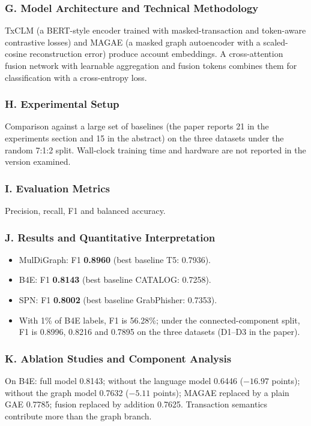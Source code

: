 \documentclass[11pt,a4paper]{article}
\begin{document}
\subsubsection*{G. Model Architecture and Technical Methodology}
TxCLM (a BERT-style encoder trained with masked-transaction and token-aware contrastive losses) and MAGAE (a masked graph autoencoder with a scaled-cosine reconstruction error) produce account embeddings. A cross-attention fusion network with learnable aggregation and fusion tokens combines them for classification with a cross-entropy loss.

\subsubsection*{H. Experimental Setup}
Comparison against a large set of baselines (the paper reports 21 in the experiments section and 15 in the abstract) on the three datasets under the random 7:1:2 split. Wall-clock training time and hardware are not reported in the version examined.

\subsubsection*{I. Evaluation Metrics}
Precision, recall, F1 and balanced accuracy.

\subsubsection*{J. Results and Quantitative Interpretation}
\begin{itemize}[leftmargin=*]
    \item MulDiGraph: F1 \textbf{0.8960} (best baseline T5: 0.7936).
    \item B4E: F1 \textbf{0.8143} (best baseline CATALOG: 0.7258).
    \item SPN: F1 \textbf{0.8002} (best baseline GrabPhisher: 0.7353).
    \item With 1\% of B4E labels, F1 is 56.28\%; under the connected-component split, F1 is 0.8996, 0.8216 and 0.7895 on the three datasets (D1--D3 in the paper).
\end{itemize}

\subsubsection*{K. Ablation Studies and Component Analysis}
On B4E: full model 0.8143; without the language model 0.6446 ($-16.97$ points); without the graph model 0.7632 ($-5.11$ points); MAGAE replaced by a plain GAE 0.7785; fusion replaced by addition 0.7625. Transaction semantics contribute more than the graph branch.
\end{document}
